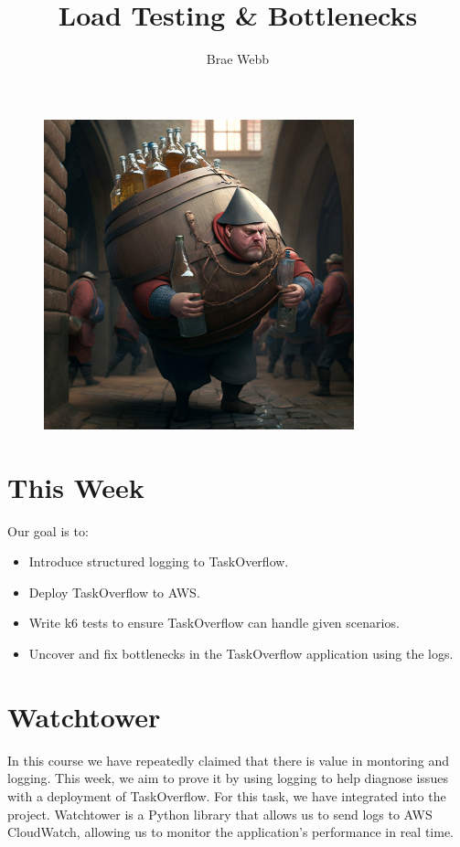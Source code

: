 \documentclass{csse4400}
\title{Load Testing \& Bottlenecks}
\author{Brae Webb}
\date{\week[practical]{9}}
\begin{document}
\maketitle

\begin{figure}[h]
    \centering
    \includegraphics[width=0.8\textwidth]{images/bottleneck}
\end{figure}

\section{This Week}
Our goal is to:
\begin{itemize}
  \item Introduce structured logging to TaskOverflow.
  \item Deploy TaskOverflow to AWS.
  \item Write k6 tests to ensure TaskOverflow can handle given scenarios.
  \item Uncover and fix bottlenecks in the TaskOverflow application using the logs.
\end{itemize}

\section{Watchtower}
In this course we have repeatedly claimed that there is value in montoring and logging.
This week, we aim to prove it by using logging to help diagnose issues with a deployment of TaskOverflow.
For this task, we have integrated  into the project.
Watchtower is a Python library that allows us to send logs to AWS CloudWatch,
allowing us to monitor the application's performance in real time.
\end{document}
